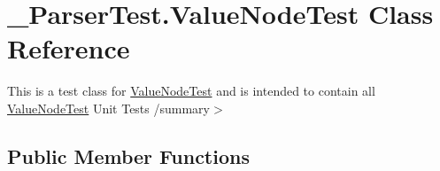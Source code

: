 \hypertarget{class__1920_parser_test_1_1_value_node_test}{}\section{\+\_\+Parser\+Test.\+Value\+Node\+Test Class Reference}
\label{class__1920_parser_test_1_1_value_node_test}


This is a test class for \hyperlink{class__1920_parser_test_1_1_value_node_test}{Value\+Node\+Test} and is intended to contain all \hyperlink{class__1920_parser_test_1_1_value_node_test}{Value\+Node\+Test} Unit Tests /summary$>$  


\subsection*{Public Member Functions}
